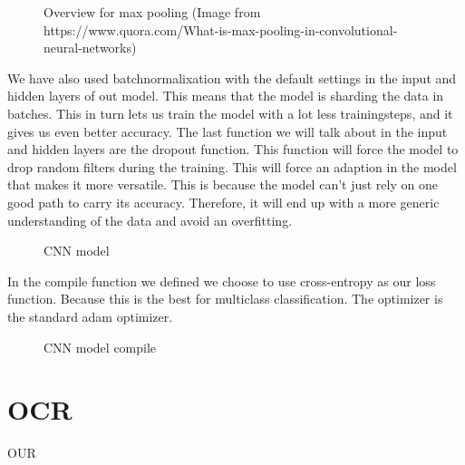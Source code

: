 \begin{figure}[h]
    \caption{Overview for max pooling (Image from https://www.quora.com/What-is-max-pooling-in-convolutional-neural-networks)}
    \label{fig:figure6}

\end{figure}

We have also used batchnormalixation with the default settings in the input and hidden layers of out model.
This means that the model is sharding the data in batches.
This in turn lets us train the model with a lot less trainingsteps, and it gives us even better accuracy.
The last function we will talk about in the input and hidden layers are the dropout function.
This function will force the model to drop random filters during the training.
This will force an adaption in the model that makes it more versatile.
This is because the model can't just rely on one good path to carry its accuracy.
Therefore, it will end up with a more generic understanding of the data and avoid an overfitting.

\begin{figure}[h]
    \caption{CNN model}
    \label{fig:figure4}

\end{figure}

In the compile function we defined we choose to use cross-entropy as our loss function.
Because this is the best for multiclass classification.
The optimizer is the standard adam optimizer.



\begin{figure}[h]
    \caption{CNN model compile}
    \label{fig:figure5}

\end{figure}


\section{OCR}\label{sec:OCR}

OUR



